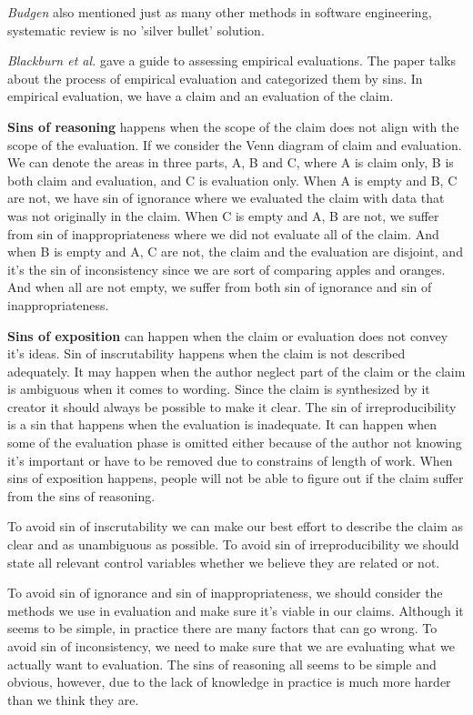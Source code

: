 \documentclass[sigconf]{acmart}
\begin{document}
{\it Budgen} also mentioned just as many other methods in software engineering, systematic review is no 'silver bullet' solution.

{\it Blackburn et al.} gave a guide to assessing empirical evaluations. The paper talks about the process of empirical evaluation and categorized them by sins. In empirical evaluation, we have a claim and an evaluation of the claim. 

{\bf Sins of reasoning} happens when the scope of the claim does not align with the scope of the evaluation. If we consider the Venn diagram of claim and evaluation. We can denote the areas in three parts, A, B and C, where A is claim only, B is both claim and evaluation, and C is evaluation only. When A is empty and B, C are not, we have sin of ignorance where we evaluated the claim with data that was not originally in the claim. When C is empty and A, B are not, we suffer from sin of inappropriateness where we did not evaluate all of the claim. And when B is empty and A, C are not, the claim and the evaluation are disjoint, and it's the sin of inconsistency since we are sort of comparing apples and oranges. And when all are not empty, we suffer from both sin of ignorance and sin of inappropriateness.

{\bf Sins of exposition} can happen when the claim or evaluation does not convey it's ideas. Sin of inscrutability happens when the claim is not described adequately. It may happen when the author neglect part of the claim or the claim is ambiguous when it comes to wording. Since the claim is synthesized by it creator it should always be possible to make it clear. The sin of irreproducibility is a sin that happens when the evaluation is inadequate. It can happen when some of the evaluation phase is omitted either because of the author not knowing it's important or have to be removed due to constrains of length of work. When sins of exposition happens, people will not be able to figure out if the claim suffer from the sins of reasoning.

To avoid sin of inscrutability we can make our best effort to describe the claim as clear and as unambiguous as possible. To avoid sin of irreproducibility we should state all relevant control variables whether we believe they are related or not.

To avoid sin of ignorance and sin of inappropriateness, we should consider the methods we use in evaluation and make sure it's viable in our claims. Although it seems to be simple, in practice there are many factors that can go wrong. To avoid sin of inconsistency, we need to make sure that we are evaluating what we actually want to evaluation. The sins of reasoning all seems to be simple and obvious, however, due to the lack of knowledge in practice is much more harder than we think they are.
\end{document}

